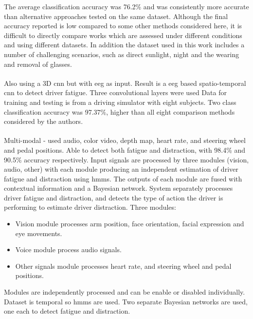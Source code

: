 \documentclass[11pt, parskip=half*,twoside=false]{scrbook}
\begin{document}
The average classification accuracy was 76.2\% and was consistently more accurate than alternative approaches tested on the same dataset. Although the final accuracy reported is low compared to some other methods considered here, it is difficult to directly compare works which are assessed under different conditions and using different datasets. In addition the dataset used in this work includes a number of challenging scenarios, such as direct sunlight, night and the wearing and removal of glasses.

\paragraph{\citet{trutschelPERCLOSAlertnessMeasure2011}}

\paragraph{\citet{gaoEEGBasedSpatioTemporal2019}} Also using a 3D \gls{cnn} but with \gls{eeg} as input. Result is a \gls{eeg} based spatio-temporal \gls{cnn} to detect driver fatigue. Three convolutional layers were used Data for training and testing is from a driving simulator with eight subjects. Two class classification accuracy was 97.37\%, higher than all eight comparison methods considered by the authors.

\paragraph{\citet{crayeMultiModalDriverFatigue2016}} Multi-modal - used audio, color video, depth map, heart rate, and steering wheel and pedal positions. Able to detect both fatigue and distraction, with 98.4\% and 90.5\% accuracy respectively. Input signals are processed by three modules (vision, audio, other) with each module producing an independent estimation of driver fatigue and distraction using \glspl{hmm}. The outputs of each module are fused with contextual information and a Bayesian network. System separately processes driver fatigue and distraction, and detects the type of action the driver is performing to estimate driver distraction.  Three modules: 
\begin{itemize}
	\item Vision module processes arm position, face orientation, facial expression and eye movements.
	\item Voice module process audio signals.
	\item Other signals module processes heart rate, and steering wheel and pedal positions.
\end{itemize}
Modules are independently processed and can be enable or disabled individually. Dataset is temporal so \glspl{hmm} are used. Two separate Bayesian networks are used, one each to detect fatigue and distraction.
\end{document}
